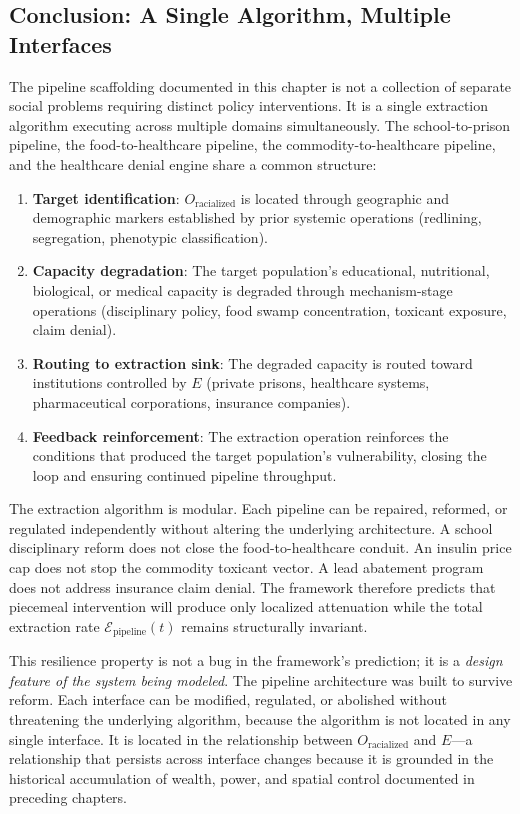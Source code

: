 \subsection{Conclusion: A Single Algorithm, Multiple Interfaces}

The pipeline scaffolding documented in this chapter is not a collection of separate social problems requiring distinct policy interventions. It is a single extraction algorithm executing across multiple domains simultaneously. The school-to-prison pipeline, the food-to-healthcare pipeline, the commodity-to-healthcare pipeline, and the healthcare denial engine share a common structure:

\begin{enumerate}[leftmargin=2em]
    \item \textbf{Target identification}: $O_{\text{racialized}}$ is located through geographic and demographic markers established by prior systemic operations (redlining, segregation, phenotypic classification).
    \item \textbf{Capacity degradation}: The target population's educational, nutritional, biological, or medical capacity is degraded through mechanism-stage operations (disciplinary policy, food swamp concentration, toxicant exposure, claim denial).
    \item \textbf{Routing to extraction sink}: The degraded capacity is routed toward institutions controlled by $E$ (private prisons, healthcare systems, pharmaceutical corporations, insurance companies).
    \item \textbf{Feedback reinforcement}: The extraction operation reinforces the conditions that produced the target population's vulnerability, closing the loop and ensuring continued pipeline throughput.
\end{enumerate}

The extraction algorithm is modular. Each pipeline can be repaired, reformed, or regulated independently without altering the underlying architecture. A school disciplinary reform does not close the food-to-healthcare conduit. An insulin price cap does not stop the commodity toxicant vector. A lead abatement program does not address insurance claim denial. The framework therefore predicts that piecemeal intervention will produce only localized attenuation while the total extraction rate $\mathcal{E}_{\text{pipeline}}(t)$ remains structurally invariant.

This resilience property is not a bug in the framework's prediction; it is a \textit{design feature of the system being modeled}. The pipeline architecture was built to survive reform. Each interface can be modified, regulated, or abolished without threatening the underlying algorithm, because the algorithm is not located in any single interface. It is located in the relationship between $O_{\text{racialized}}$ and $E$---a relationship that persists across interface changes because it is grounded in the historical accumulation of wealth, power, and spatial control documented in preceding chapters.

